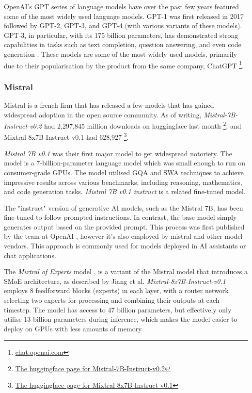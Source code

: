 OpenAI's \gls{GPT} series of language models have over the past few years featured some of the most widely used language models. GPT-1 was first released in 2017 followed by GPT-2, GPT-3, and GPT-4 (with various variants of these models). GPT-3, in particular, with its 175 billion parameters, has demonstrated strong capabilities in tasks such as text completion, question answering, and even code generation \cite{brown_language_2020}. These models are some of the most widely used models, primarily due to their popularisation by the product from the same company, ChatGPT \footnote{\href{https://chat.openai.com}{chat.openai.com}}.


\subsubsection{Mistral}
\label{sec:mistral_models}


Mistral is a french firm that has released a few models that has gained widespread adoption in the open source community. As of writing, \textit{Mistral-7B-Instruct-v0.2} had 2,297,845 million downloads on huggingface last month \footnote{\href{https://huggingface.co/mistralai/Mistral-7B-Instruct-v0.2}{The huggingface page for Mistral-7B-Instruct-v0.2}}, and Mixtral-8x7B-Instruct-v0.1 had 628,927 \footnote{\href{https://huggingface.co/mistralai/Mixtral-8x7B-Instruct-v0.1}{The huggingface page for Mixtral-8x7B-Instruct-v0.1}}.


\textit{Mistral 7B v0.1} \cite{jiang_mistral_2023} was their first major model to get widespread notoriety. The model is a 7-billion-parameter language model which was small enough to run on consumer-grade GPUs. The model utilised \gls{GQA}\cite{ainslie_gqa_2023} and \gls{SWA} \cite{roy_efficient_2020} techniques to achieve impressive results across various benchmarks, including reasoning, mathematics, and code generation tasks. \textit{Mistral 7B v0.1 instruct} is a related fine-tuned model.


The "instruct" version of generative AI models, such as the Mistral 7B, has been fine-tuned to follow prompted instructions. In contrast, the base model simply generates output based on the provided prompt. This process was first published by the team at OpenAI \cite{ouyang_training_2022}, however it’s also employed by mistral and other model vendors. This approach is commonly used for models deployed in AI assistants or chat applications.


The \textit{Mixtral of Experts} model \cite{jiang_mixtral_2024}, is a variant of the Mistral model that introduces a \gls{SMoE} architecture, as described by Jiang et al. \textit{Mixtral-8x7B-Instruct-v0.1} employs 8 feedforward blocks (experts) in each layer, with a router network selecting two experts for processing and combining their outputs at each timestep. The model has access to 47 billion parameters, but effectively only utilise 13 billion parameters during inference, which makes the model easier to deploy on GPUs with less amounts of memory.


